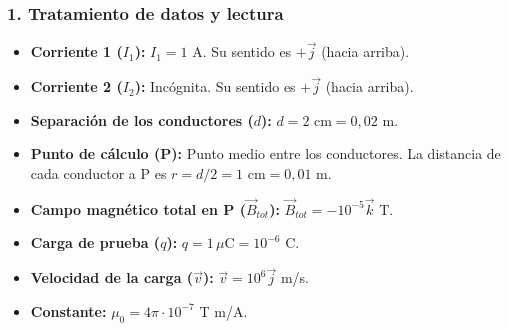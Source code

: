 \subsubsection*{1. Tratamiento de datos y lectura}
\begin{itemize}
    \item \textbf{Corriente 1 ($I_1$):} $I_1 = 1$ A. Su sentido es $+\vec{j}$ (hacia arriba).
    \item \textbf{Corriente 2 ($I_2$):} Incógnita. Su sentido es $+\vec{j}$ (hacia arriba).
    \item \textbf{Separación de los conductores ($d$):} $d = 2 \text{ cm} = 0,02 \text{ m}$.
    \item \textbf{Punto de cálculo (P):} Punto medio entre los conductores. La distancia de cada conductor a P es $r = d/2 = 1 \text{ cm} = 0,01 \text{ m}$.
    \item \textbf{Campo magnético total en P ($\vec{B}_{tot}$):} $\vec{B}_{tot} = -10^{-5} \vec{k}$ T.
    \item \textbf{Carga de prueba ($q$):} $q = 1 \, \mu\text{C} = 10^{-6}$ C.
    \item \textbf{Velocidad de la carga ($\vec{v}$):} $\vec{v} = 10^6 \vec{j}$ m/s.
    \item \textbf{Constante:} $\mu_0 = 4\pi \cdot 10^{-7}$ T m/A.
\end{itemize}

